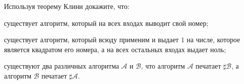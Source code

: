 Используя теорему Клини докажите, что:
\begin{enumcyr}
	\item существует алгоритм, который на всех входах выводит свой номер;
    \item существует алгоритм, который всюду применим и выдает $1$ на числе, которое является квадратом его номера, а на всех
	    остальных входах выдает ноль;
    \item существуют два различных алгоритма $\mathcal{A}$ и $\mathcal{B}$, что алгоритм $\mathcal{A}$ печатает $\sharp
	    \mathcal{B}$, а алгоритм $\mathcal{B}$ печатает $\sharp \mathcal{A}$.
\end{enumcyr}